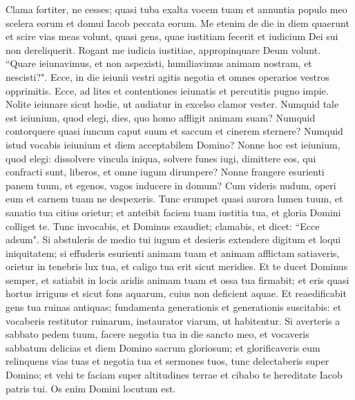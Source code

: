 \begin{biblechapter}  
\verse Clama fortiter, ne cesses; quasi tuba exalta vocem tuam et annuntia populo meo scelera eorum et domui Iacob peccata eorum. 
\verse Me etenim de die in diem quaerunt et scire vias meas volunt, quasi gens, quae iustitiam fecerit et iudicium Dei sui non dereliquerit. Rogant me iudicia iustitiae, appropinquare Deum volunt. 
\verse “Quare ieiunavimus, et non aspexisti, humiliavimus animam nostram, et nescisti?". Ecce, in die ieiunii vestri agitis negotia et omnes operarios vestros opprimitis. 
\verse Ecce, ad lites et contentiones ieiunatis et percutitis pugno impie. Nolite ieiunare sicut hodie, ut audiatur in excelso clamor vester. 
\verse Numquid tale est ieiunium, quod elegi, dies, quo homo affligit animam suam? Numquid contorquere quasi iuncum caput suum et saccum et cinerem sternere? Numquid istud vocabis ieiunium et diem acceptabilem Domino? 
\verse Nonne hoc est ieiunium, quod elegi: dissolvere vincula iniqua, solvere funes iugi, dimittere eos, qui confracti sunt, liberos, et omne iugum dirumpere? 
\verse Nonne frangere esurienti panem tuum, et egenos, vagos inducere in domum? Cum videris nudum, operi eum et carnem tuam ne despexeris. 
\verse Tunc erumpet quasi aurora lumen tuum, et sanatio tua citius orietur; et anteibit faciem tuam iustitia tua, et gloria Domini colliget te. 
\verse Tunc invocabis, et Dominus exaudiet; clamabis, et dicet: “Ecce adsum". Si abstuleris de medio tui iugum et desieris extendere digitum et loqui iniquitatem; 
\verse si effuderis esurienti animam tuam et animam afflictam satiaveris, orietur in tenebris lux tua, et caligo tua erit sicut meridies. 
\verse Et te ducet Dominus semper, et satiabit in locis aridis animam tuam et ossa tua firmabit; et eris quasi hortus irriguus et sicut fons aquarum, cuius non deficient aquae. 
\verse Et reaedificabit gens tua ruinas antiquas; fundamenta generationis et generationis suscitabis: et vocaberis restitutor ruinarum, instaurator viarum, ut habitentur. 
\verse Si averteris a sabbato pedem tuum, facere negotia tua in die sancto meo, et vocaveris sabbatum delicias et diem Domino sacrum gloriosum; et glorificaveris eum relinquens vias tuas et negotia tua et sermones tuos, 
\verse tunc delectaberis super Domino; et vehi te faciam super altitudines terrae et cibabo te hereditate Iacob patris tui. Os enim Domini locutum est. 
\end{biblechapter}

